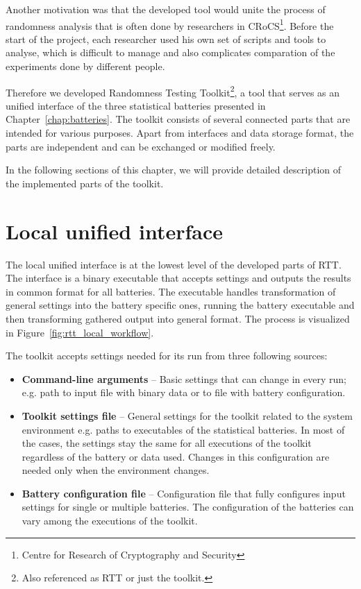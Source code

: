 \documentclass[
  digital,  	%
  color,		%
  oneside,   	%
  12pt,
  nocover,
  notable,
  nolof,
  nolot,
]{fithesis3}
\begin{document}
Another motivation was that the developed tool would unite the process of randomness analysis that is often done by researchers in CRoCS\footnote{Centre for Research of Cryptography and Security}. Before the start of the project, each researcher used his own set of scripts and tools to analyse, which is difficult to manage and also complicates comparation of the experiments done by different people.

Therefore we developed Randomness Testing Toolkit\footnote{Also referenced as RTT or just the toolkit.}, a tool that serves as an unified interface of the three statistical batteries presented in Chapter~\ref{chap:batteries}. The toolkit consists of several connected parts that are intended for various purposes. Apart from interfaces and data storage format, the parts are independent and can be exchanged or modified freely.

In the following sections of this chapter, we will provide detailed description of the implemented parts of the toolkit.

\section{Local unified interface}
The local unified interface is at the lowest level of the developed parts of RTT. The interface is a binary executable that accepts settings and outputs the results in common format for all batteries. The executable handles transformation of general settings into the battery specific ones, running the battery executable and then transforming gathered output into general format. The process is visualized in Figure~\ref{fig:rtt_local_workflow}.

The toolkit accepts settings needed for its run from three following sources:
\begin{itemize}
\item \textbf{Command-line arguments} -- Basic settings that can change in every run; e.g. path to input file with binary data or to file with battery configuration.
\item \textbf{Toolkit settings file} -- General settings for the toolkit related to the system environment e.g. paths to executables of the statistical batteries. In most of the cases, the settings stay the same for all executions of the toolkit regardless of the battery or data used. Changes in this configuration are needed only when the environment changes.
\item \textbf{Battery configuration file} -- Configuration file that fully configures input settings for single or multiple batteries. The configuration of the batteries can vary among the executions of the toolkit.
\end{itemize}
\end{document}

